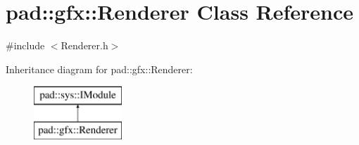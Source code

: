 \hypertarget{classpad_1_1gfx_1_1_renderer}{}\section{pad\+:\+:gfx\+:\+:Renderer Class Reference}
\label{classpad_1_1gfx_1_1_renderer}


{\ttfamily \#include $<$Renderer.\+h$>$}

Inheritance diagram for pad\+:\+:gfx\+:\+:Renderer\+:\begin{figure}[H]
\begin{center}
\leavevmode
\includegraphics[height=2.000000cm]{classpad_1_1gfx_1_1_renderer}
\end{center}
\end{figure}
